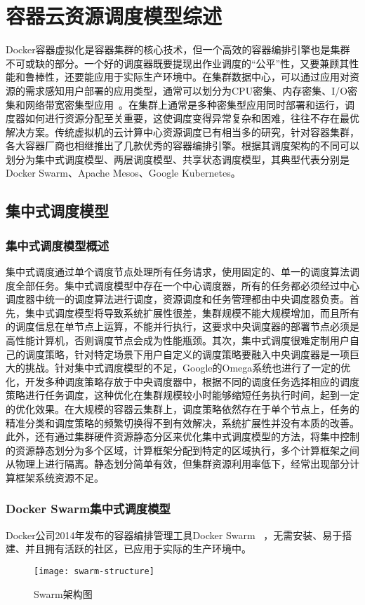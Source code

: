 \chapter{容器云资源调度模型综述}
Docker容器虚拟化是容器集群的核心技术，但一个高效的容器编排引擎也是集群不可或缺的部分。一个好的调度器既要提现出作业调度的“公平”性，又要兼顾其性能和鲁棒性，还要能应用于实际生产环境中。在集群数据中心，可以通过应用对资源的需求感知用户部署的应用类型，通常可以划分为CPU密集、内存密集、I/O密集和网络带宽密集型应用~\cite{Peng2016Research,Shuangke2017SchedulingStrategy}。在集群上通常是多种密集型应用同时部署和运行，调度器如何进行资源分配至关重要，这使调度变得异常复杂和困难，往往不存在最优解决方案。传统虚拟机的云计算中心资源调度已有相当多的研究，针对容器集群，各大容器厂商也相继推出了几款优秀的容器编排引擎。根据其调度架构的不同可以划分为集中式调度模型、两层调度模型、共享状态调度模型，其典型代表分别是Docker Swarm、Apache Mesos、Google Kubernetes。

\section{集中式调度模型}
\subsection{集中式调度模型概述}
集中式调度通过单个调度节点处理所有任务请求，使用固定的、单一的调度算法调度全部任务。集中式调度模型中存在一个中心调度器，所有的任务都必须经过中心调度器中统一的调度算法进行调度，资源调度和任务管理都由中央调度器负责。首先，集中式调度模型将导致系统扩展性很差，集群规模不能大规模增加，而且所有的调度信息在单节点上运算，不能并行执行，这要求中央调度器的部署节点必须是高性能计算机，否则调度节点会成为性能瓶颈。其次，集中式调度很难定制用户自己的调度策略，针对特定场景下用户自定义的调度策略要融入中央调度器是一项巨大的挑战。针对集中式调度模型的不足，Google的Omega系统也进行了一定的优化，开发多种调度策略存放于中央调度器中，根据不同的调度任务选择相应的调度策略进行任务调度，这种优化在集群规模较小时能够缩短任务执行时间，起到一定的优化效果。在大规模的容器云集群上，调度策略依然存在于单个节点上，任务的精准分类和调度策略的频繁切换得不到有效解决，系统扩展性并没有本质的改善。此外，还有通过集群硬件资源静态分区来优化集中式调度模型的方法，将集中控制的资源静态划分为多个区域，计算框架分配到特定的区域执行，多个计算框架之间从物理上进行隔离。静态划分简单有效，但集群资源利用率低下，经常出现部分计算框架系统资源不足。

\subsection{Docker Swarm集中式调度模型}
Docker公司2014年发布的容器编排管理工具Docker Swarm~\cite{Jansen2016Employing,Naik2016Building} ，无需安装、易于搭建、并且拥有活跃的社区，已应用于实际的生产环境中。
\begin{figure}[H] %
	\centering
	\texttt{[image: swarm-structure]}
	\caption{Swarm架构图\cite{Naik2016Building} }
\end{figure}

